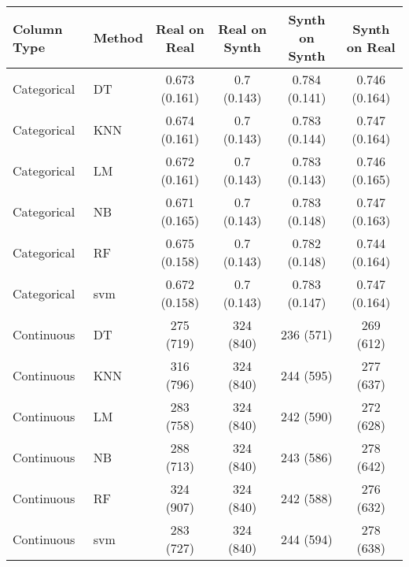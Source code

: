 
\begin{tabular}{llcccc}
    \toprule
    Column Type & Method & Real on Real  & Real on Synth & Synth on Synth & Synth on Real \\
    \midrule
    Categorical & DT     & 0.673 (0.161) & 0.7 (0.143)   & 0.784 (0.141)  & 0.746 (0.164) \\
    Categorical & KNN    & 0.674 (0.161) & 0.7 (0.143)   & 0.783 (0.144)  & 0.747 (0.164) \\
    Categorical & LM     & 0.672 (0.161) & 0.7 (0.143)   & 0.783 (0.143)  & 0.746 (0.165) \\
    Categorical & NB     & 0.671 (0.165) & 0.7 (0.143)   & 0.783 (0.148)  & 0.747 (0.163) \\
    Categorical & RF     & 0.675 (0.158) & 0.7 (0.143)   & 0.782 (0.148)  & 0.744 (0.164) \\
    Categorical & \acs{svm}    & 0.672 (0.158) & 0.7 (0.143)   & 0.783 (0.147)  & 0.747 (0.164) \\
    \midrule
    Continuous  & DT     & 275 (719) & 324 (840) & 236 (571)  & 269 (612) \\
    Continuous  & KNN    & 316 (796) & 324 (840) & 244 (595)  & 277 (637) \\
    Continuous  & LM     & 283 (758) & 324 (840) & 242 (590)  & 272 (628) \\
    Continuous  & NB     & 288 (713) & 324 (840) & 243 (586)  & 278 (642) \\
    Continuous  & RF     & 324 (907) & 324 (840) & 242 (588)  & 276 (632) \\
    Continuous  & \acs{svm}    & 283 (727) & 324 (840) & 244 (594)  & 278 (638) \\   
    \bottomrule
    \end{tabular}
